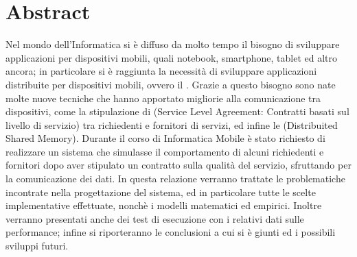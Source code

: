 \chapter*{Abstract}
Nel mondo dell'Informatica si è diffuso da molto tempo il bisogno di sviluppare applicazioni per dispositivi mobili, quali notebook, smartphone, tablet ed altro ancora; in particolare si è raggiunta la necessità di sviluppare applicazioni distribuite per dispositivi mobili, ovvero il . Grazie a questo bisogno sono nate molte nuove tecniche che hanno apportato migliorie alla comunicazione tra dispositivi, come la stipulazione di  (Service Level Agreement: Contratti basati sul livello di servizio) tra richiedenti e fornitori di servizi, ed infine le  (Distribuited Shared Memory). Durante il corso di Informatica Mobile è stato richiesto di realizzare un sistema che simulasse il comportamento di alcuni richiedenti e fornitori dopo aver stipulato un contratto sulla qualità del servizio, sfruttando  per la comunicazione dei dati. In questa relazione verranno trattate le problematiche incontrate nella progettazione del sistema, ed in particolare tutte le scelte implementative effettuate, nonchè i modelli matematici ed empirici. Inoltre verranno presentati anche dei test di esecuzione con i relativi dati sulle performance; infine si riporteranno le conclusioni a cui si è giunti ed i possibili sviluppi futuri.